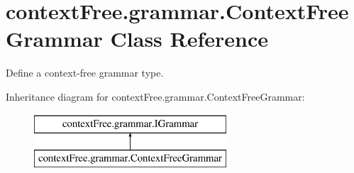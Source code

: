 \hypertarget{classcontext_free_1_1grammar_1_1_context_free_grammar}{\section{context\-Free.\-grammar.\-Context\-Free\-Grammar Class Reference}
\label{classcontext_free_1_1grammar_1_1_context_free_grammar}
}


Define a context-\/free grammar type.  


Inheritance diagram for context\-Free.\-grammar.\-Context\-Free\-Grammar\-:\begin{figure}[H]
\begin{center}
\leavevmode
\includegraphics[height=2.000000cm]{classcontext_free_1_1grammar_1_1_context_free_grammar}
\end{center}
\end{figure}
